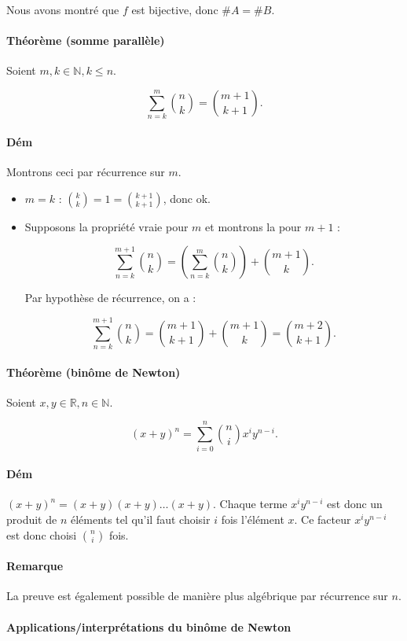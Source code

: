 \documentclass{article}
\begin{document}
			Nous avons montré que $f$ est bijective, donc $\#A = \#B$.

			\paragraph{Théorème (somme parallèle)} Soient $m, k \in \mathbb N, k \leq n$.

			\[\sum_{n=k}^m\binom nk = \binom {m+1}{k+1}.\]

			\paragraph{Dém} Montrons ceci par récurrence sur $m$.

			\begin{itemize}
				\item $m = k$ : $\binom kk = 1 = \binom {k+1}{k+1}$, donc ok.
				\item Supposons la propriété vraie pour $m$ et montrons la pour $m+1$ :

				\[\sum_{n=k}^{m+1}\binom nk = \left(\sum_{n=k}^m\binom nk\right) + \binom {m+1}k.\]

				Par hypothèse de récurrence, on a :

				\[\sum_{n=k}^{m+1}\binom nk = \binom {m+1}{k+1} + \binom {m+1}{k} = \binom {m+2}{k+1}.\]
			\end{itemize}

			\paragraph{Théorème (binôme de Newton)} Soient $x, y \in \mathbb R, n \in \mathbb N$.

			\[(x+y)^n = \sum_{i=0}^n\binom nix^iy^{n-i}.\]

			\paragraph{Dém} $(x+y)^n = (x+y)(x+y)\ldots(x+y)$. Chaque terme $x^iy^{n-i}$ est donc un produit de $n$ éléments tel qu'il faut choisir $i$ fois l'élément $x$.
			Ce facteur $x^iy^{n-i}$ est donc choisi $\binom ni$ fois.

			\paragraph{Remarque} La preuve est également possible de manière plus algébrique par récurrence sur $n$.

			\paragraph{Applications/interprétations du binôme de Newton}
\end{document}
